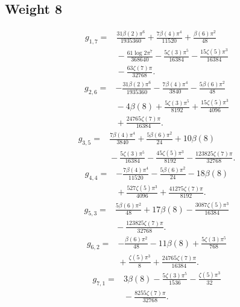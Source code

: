 \subsection*{Weight 8}
\begin{align*}g_{1,7}={}&\frac{31 \beta(2) \pi^{6}}{1935360}+\frac{7 \beta(4) \pi^{4}}{11520}+\frac{\beta(6) \pi^{2}}{48}\\
&{}- \frac{61 \log 2 \pi^{7}}{368640}- \frac{5 \zeta(3) \pi^{5}}{16384}- \frac{15 \zeta(5) \pi^{3}}{16384}\\
&{}- \frac{63 \zeta(7) \pi}{32768}.\end{align*}
\begin{align*}g_{2,6}={}&- \frac{31 \beta(2) \pi^{6}}{1935360}- \frac{7 \beta(4) \pi^{4}}{3840}- \frac{5 \beta(6) \pi^{2}}{48}\\
&{}- 4 \beta(8)+\frac{5 \zeta(3) \pi^{5}}{8192}+\frac{15 \zeta(5) \pi^{3}}{4096}\\
&{}+\frac{24765 \zeta(7) \pi}{16384}.\end{align*}
\begin{align*}g_{3,5}={}&\frac{7 \beta(4) \pi^{4}}{3840}+\frac{5 \beta(6) \pi^{2}}{24}+10 \beta(8)\\
&{}- \frac{5 \zeta(3) \pi^{5}}{16384}- \frac{45 \zeta(5) \pi^{3}}{8192}- \frac{123825 \zeta(7) \pi}{32768}.\end{align*}
\begin{align*}g_{4,4}={}&- \frac{7 \beta(4) \pi^{4}}{11520}- \frac{5 \beta(6) \pi^{2}}{24}- 18 \beta(8)\\
&{}+\frac{527 \zeta(5) \pi^{3}}{4096}+\frac{41275 \zeta(7) \pi}{8192}.\end{align*}
\begin{align*}g_{5,3}={}&\frac{5 \beta(6) \pi^{2}}{48}+17 \beta(8)- \frac{3087 \zeta(5) \pi^{3}}{16384}\\
&{}- \frac{123825 \zeta(7) \pi}{32768}.\end{align*}
\begin{align*}g_{6,2}={}&- \frac{\beta(6) \pi^{2}}{48}- 11 \beta(8)+\frac{5 \zeta(3) \pi^{5}}{768}\\
&{}+\frac{\zeta(5) \pi^{3}}{8}+\frac{24765 \zeta(7) \pi}{16384}.\end{align*}
\begin{align*}g_{7,1}={}&3 \beta(8)- \frac{5 \zeta(3) \pi^{5}}{1536}- \frac{\zeta(5) \pi^{3}}{32}\\
&{}- \frac{8255 \zeta(7) \pi}{32768}.\end{align*}
